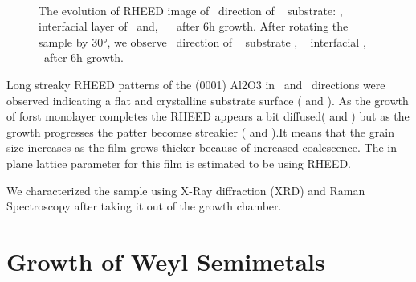 \begin{figure}
   
    \centering
    \\
    \caption{
        The evolution of RHEED image of \dirx\ direction of 
        \sfA~ substrate:  \alumina, 
        \sfB~  interfacial layer of \nbse\ and,  
        \sfC~  \nbse\ after 6h growth. After rotating the sample by 30°,
         we observe \diry\ direction of 
        \sfD~ substrate ,
        \sfE~ interfacial \nbse ,
        \sfF~ \nbse\ after 6h growth.
    }
\end{figure}
Long streaky RHEED patterns of the (0001) Al2O3 in \dirx\ and \diry\ directions were observed 
indicating a flat and crystalline substrate surface  ( and 
).  As the growth of forst monolayer completes the RHEED appears a 
bit diffused( and ) but as 
the growth progresses the patter becomse streakier ( and 
).It means that the grain size increases as the film grows thicker  
because of increased coalescence. The in-plane lattice parameter for this film 
is estimated to be  using RHEED.

We characterized the sample using X-Ray diffraction (XRD) and Raman Spectroscopy after taking it out of the growth chamber.

\section{Growth of Weyl Semimetals}
